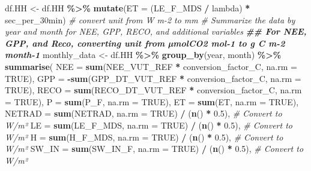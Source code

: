 \documentclass[
]{article}
\newenvironment{Shaded}{\begin{snugshade}}{\end{snugshade}}
\newcommand{\AttributeTok}[1]{\textcolor[rgb]{0.13,0.29,0.53}{#1}}
\newcommand{\CommentTok}[1]{\textcolor[rgb]{0.56,0.35,0.01}{\textit{#1}}}
\newcommand{\ConstantTok}[1]{\textcolor[rgb]{0.56,0.35,0.01}{#1}}
\newcommand{\DocumentationTok}[1]{\textcolor[rgb]{0.56,0.35,0.01}{\textbf{\textit{#1}}}}
\newcommand{\FloatTok}[1]{\textcolor[rgb]{0.00,0.00,0.81}{#1}}
\newcommand{\FunctionTok}[1]{\textcolor[rgb]{0.13,0.29,0.53}{\textbf{#1}}}
\newcommand{\NormalTok}[1]{#1}
\newcommand{\OtherTok}[1]{\textcolor[rgb]{0.56,0.35,0.01}{#1}}
\newcommand{\SpecialCharTok}[1]{\textcolor[rgb]{0.81,0.36,0.00}{\textbf{#1}}}
\begin{document}
\begin{Shaded}
\begin{Highlighting}[]
\NormalTok{df.HH }\OtherTok{\textless{}{-}}\NormalTok{ df.HH }\SpecialCharTok{\%\textgreater{}\%}
  \FunctionTok{mutate}\NormalTok{(}\AttributeTok{ET =}\NormalTok{ (LE\_F\_MDS }\SpecialCharTok{/}\NormalTok{ lambda) }\SpecialCharTok{*}\NormalTok{ sec\_per\_30min) }\CommentTok{\# convert unit from  W m{-}2 to mm}
\CommentTok{\# Summarize the data by year and month for NEE, GPP, RECO, and additional variables}
\DocumentationTok{\#\# For NEE, GPP, and Reco, converting unit from µmolCO2 mol{-}1 to g C m{-}2 month{-}1}
\NormalTok{monthly\_data }\OtherTok{\textless{}{-}}\NormalTok{ df.HH }\SpecialCharTok{\%\textgreater{}\%}
  \FunctionTok{group\_by}\NormalTok{(year, month) }\SpecialCharTok{\%\textgreater{}\%}
  \FunctionTok{summarise}\NormalTok{(}
    \AttributeTok{NEE =} \FunctionTok{sum}\NormalTok{(NEE\_VUT\_REF }\SpecialCharTok{*}\NormalTok{ conversion\_factor\_C, }\AttributeTok{na.rm =} \ConstantTok{TRUE}\NormalTok{), }
    \AttributeTok{GPP =} \SpecialCharTok{{-}}\FunctionTok{sum}\NormalTok{(GPP\_DT\_VUT\_REF }\SpecialCharTok{*}\NormalTok{ conversion\_factor\_C, }\AttributeTok{na.rm =} \ConstantTok{TRUE}\NormalTok{),}
    \AttributeTok{RECO =} \FunctionTok{sum}\NormalTok{(RECO\_DT\_VUT\_REF }\SpecialCharTok{*}\NormalTok{ conversion\_factor\_C, }\AttributeTok{na.rm =} \ConstantTok{TRUE}\NormalTok{),}
    \AttributeTok{P =} \FunctionTok{sum}\NormalTok{(P\_F, }\AttributeTok{na.rm =} \ConstantTok{TRUE}\NormalTok{),}
    \AttributeTok{ET =} \FunctionTok{sum}\NormalTok{(ET, }\AttributeTok{na.rm =} \ConstantTok{TRUE}\NormalTok{),}
    \AttributeTok{NETRAD =} \FunctionTok{sum}\NormalTok{(NETRAD, }\AttributeTok{na.rm =} \ConstantTok{TRUE}\NormalTok{) }\SpecialCharTok{/}\NormalTok{ (}\FunctionTok{n}\NormalTok{() }\SpecialCharTok{*} \FloatTok{0.5}\NormalTok{),  }\CommentTok{\# Convert to W/m²}
    \AttributeTok{LE =} \FunctionTok{sum}\NormalTok{(LE\_F\_MDS, }\AttributeTok{na.rm =} \ConstantTok{TRUE}\NormalTok{) }\SpecialCharTok{/}\NormalTok{ (}\FunctionTok{n}\NormalTok{() }\SpecialCharTok{*} \FloatTok{0.5}\NormalTok{),  }\CommentTok{\# Convert to W/m²}
    \AttributeTok{H =} \FunctionTok{sum}\NormalTok{(H\_F\_MDS, }\AttributeTok{na.rm =} \ConstantTok{TRUE}\NormalTok{) }\SpecialCharTok{/}\NormalTok{ (}\FunctionTok{n}\NormalTok{() }\SpecialCharTok{*} \FloatTok{0.5}\NormalTok{),  }\CommentTok{\# Convert to W/m²}
    \AttributeTok{SW\_IN =} \FunctionTok{sum}\NormalTok{(SW\_IN\_F, }\AttributeTok{na.rm =} \ConstantTok{TRUE}\NormalTok{) }\SpecialCharTok{/}\NormalTok{ (}\FunctionTok{n}\NormalTok{() }\SpecialCharTok{*} \FloatTok{0.5}\NormalTok{),  }\CommentTok{\# Convert to W/m²}

\end{Highlighting}
\end{Shaded}
\end{document}
